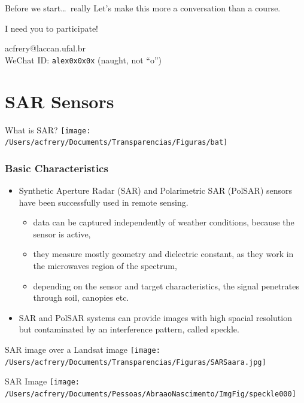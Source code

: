 \documentclass{beamer}
\begin{document}
\begin{frame}{Before we start\dots\ really}
Let's make this more a conversation than a course.

I need you to participate!

acfrery@laccan.ufal.br\\
WeChat ID: \texttt{alex0x0x0x} (naught, not ``o'')
\end{frame}

\section{SAR Sensors}

\begin{frame}{What is SAR?}
	\centering
	\texttt{[image: /Users/acfrery/Documents/Transparencias/Figuras/bat]}
\end{frame}

\begin{frame}
	\frametitle{Basic Characteristics}
	\begin{itemize}%
		
		\item Synthetic Aperture Radar (SAR) and Polarimetric SAR (PolSAR) sensors have been successfully used  in remote sensing.
		\begin{itemize}
			\item data can be captured independently of weather conditions, because the sensor is active, 
			\item they measure mostly geometry and dielectric constant, as they work in the microwaves region of the spectrum,
			\item depending on the sensor and target characteristics, the signal penetrates through soil, canopies etc.
		\end{itemize}
		
		\item SAR and PolSAR systems can provide images with high spacial resolution but contaminated by an interference pattern, called \alert{speckle}. 
	\end{itemize}
\end{frame}

\begin{frame}{SAR image over a Landsat image}
	\centering
	\texttt{[image: /Users/acfrery/Documents/Transparencias/Figuras/SARSaara.jpg]}
\end{frame}

\begin{frame}{SAR Image}
	\centering
	\texttt{[image: /Users/acfrery/Documents/Pessoas/AbraaoNascimento/ImgFig/speckle000]}
\end{frame}
\end{document}
